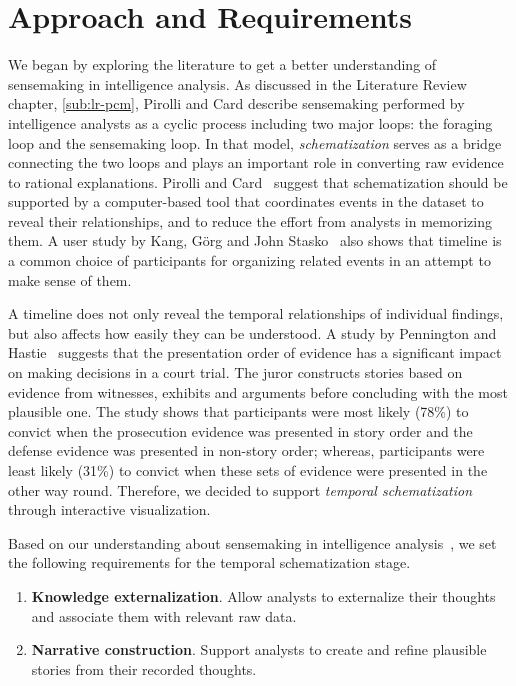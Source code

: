 \section{Approach and Requirements}
We began by exploring the literature to get a better understanding of sensemaking in intelligence analysis. As discussed in the Literature Review chapter, \autoref{sub:lr-pcm}, Pirolli and Card describe sensemaking performed by intelligence analysts as a cyclic process including two major loops: the foraging loop and the sensemaking loop. In that model, \emph{schematization} serves as a bridge connecting the two loops and plays an important role in converting raw evidence to rational explanations. Pirolli and Card~\cite{Pirolli2005} suggest that schematization should be supported by a computer-based tool that coordinates events in the dataset to reveal their relationships, and to reduce the effort from analysts in memorizing them. A user study by Kang, Görg and John Stasko~\cite{Kang2011} also shows that timeline is a common choice of participants for organizing related events in an attempt to make sense of them.

A timeline does not only reveal the temporal relationships of individual findings, but also affects how easily they can be understood. A study by Pennington and Hastie~\cite{Pennington1991} suggests that the presentation order of evidence has a significant impact on making decisions in a court trial. The juror constructs stories based on evidence from witnesses, exhibits and arguments before concluding with the most plausible one. The study shows that participants were most likely (78\%) to convict when the prosecution evidence was presented in story order and the defense evidence was presented in non-story order; whereas, participants were least likely (31\%) to convict when these sets of evidence were presented in the other way round. Therefore, we decided to support \emph{temporal schematization} through interactive visualization.

Based on our understanding about sensemaking in intelligence analysis~\cite{Heuer1999,Pirolli2005}, we set the following requirements for the temporal schematization stage.

\begin{enumerate}
	\item \textbf{Knowledge externalization}. Allow analysts to externalize their thoughts and associate them with relevant raw data.
	\item \textbf{Narrative construction}. Support analysts to create and refine plausible stories from their recorded thoughts.
\end{enumerate}

